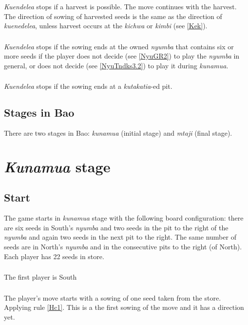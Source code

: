 \documentclass[12pt,a4paper]{article}
\begin{document}
\subsubsection{}\label{Kue1} 
{\it Kuendelea} stops if a harvest is possible. The move continues with the harvest. The direction of sowing of harvested seeds is the same as the direction of {\it kuenedelea}, unless harvest occurs at the {\it kichwa} or {\it kimbi} (see \ref{Kek}).
\subsubsection{}\label{Kue2} 
{\it Kuendelea} stops if the sowing ends at the owned {\it nyumba} that contains six or more seeds if the player does not decide (see \ref{NyuGR2}) to play the {\it nyumba} in general, or does not decide (see \ref{NyuTndks3.2}) to play it during {\it kunamua}.
\subsubsection{}\label{Kue3} 
{\it Kuendelea} stops if the sowing ends at a {\it kutakatia}-ed pit.

\subsection{Stages in Bao}\label{SiB}
There are two stages in Bao: {\it kunamua} (initial stage) and {\it mtaji} (final stage).

\section{{\it Kunamua} stage}\label{Kun}
\subsection{Start}\label{Sta}
The game starts in {\it kunamua} stage with the following board configuration: there are six seeds in South's {\it nyumba} and two seeds in the pit to the right of the {\it nyumba} and again two seeds in the next pit to the right.  The same number of seeds are in North's {\it nyumba} and in the consecutive pits to the right (of North). Each player has 22 seeds in store.

\subsubsection{}\label{Sta1}
The first player is South
\subsubsection{}\label{Sta2}
The player's move starts with a sowing of one seed taken from the store. Applying rule \ref{Hc1}. This is a the first sowing of the move and it has a direction yet.
\end{document}
